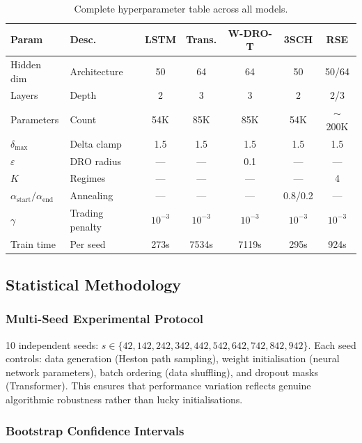 \begin{table}[H]
\centering\scriptsize
\caption{Complete hyperparameter table across all models.}
\label{tab:hyperparams}
\begin{tabular}{@{}llccccc@{}}
\toprule
\textbf{Param} & \textbf{Desc.} & \textbf{LSTM} & \textbf{Trans.} & \textbf{W-DRO-T} & \textbf{3SCH} & \textbf{RSE} \\\midrule
Hidden dim & Architecture & 50 & 64 & 64 & 50 & 50/64 \\
Layers & Depth & 2 & 3 & 3 & 2 & 2/3 \\
Parameters & Count & 54K & 85K & 85K & 54K & $\sim$200K \\
$\delta_{\max}$ & Delta clamp & 1.5 & 1.5 & 1.5 & 1.5 & 1.5 \\
$\varepsilon$ & DRO radius & --- & --- & 0.1 & --- & --- \\
$K$ & Regimes & --- & --- & --- & --- & 4 \\
$\alpha_{\text{start}}/\alpha_{\text{end}}$ & Annealing & --- & --- & --- & 0.8/0.2 & --- \\
$\gamma$ & Trading penalty & $10^{-3}$ & $10^{-3}$ & $10^{-3}$ & $10^{-3}$ & $10^{-3}$ \\
Train time & Per seed & 273s & 7534s & 7119s & 295s & 924s \\
\bottomrule
\end{tabular}
\end{table}

\subsection{Statistical Methodology}
\label{sec:stats}

\subsubsection{Multi-Seed Experimental Protocol}

10 independent seeds: $s \in \{42, 142, 242, 342, 442, 542, 642, 742, 842, 942\}$. Each seed controls: data generation (Heston path sampling), weight initialisation (neural network parameters), batch ordering (data shuffling), and dropout masks (Transformer). This ensures that performance variation reflects genuine algorithmic robustness rather than lucky initialisations.

\subsubsection{Bootstrap Confidence Intervals}


